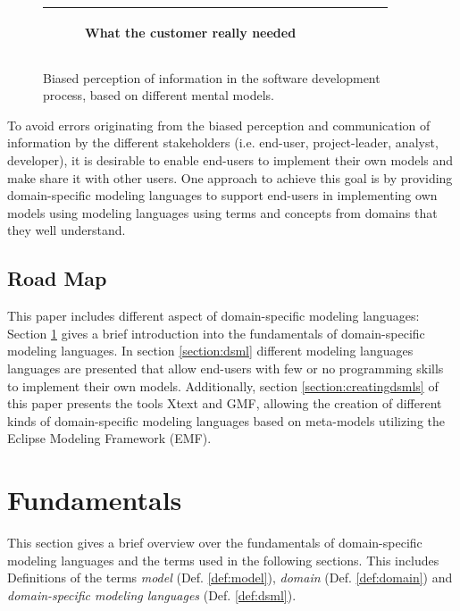 \documentclass[runningheads,a4paper]{llncs}
\begin{document}
\begin{figure}[h]
\begin{center}
\begin{tabular}{|c|c|c|c|c|}
\begin{subfigure}[t]{0.15\textwidth}
\caption*{\tiny \centering What the customer really needed}\label{fig:whatneeded}\end{subfigure}\\
\hline
\end{tabular}
\caption{Biased perception of information in the software development process, based on different mental models.}
\label{fig:swingexample}
\end{center}
\end{figure}
To avoid errors originating from the biased perception and communication of information by the different stakeholders (i.e. end-user, project-leader, analyst, developer), 
it is desirable to enable end-users to implement their own models and make share it with other users. 
One approach to achieve this goal is by providing domain-specific modeling languages to support 
end-users in implementing own models using modeling languages using terms and concepts from domains that they well understand.

\subsection{Road Map}
This paper includes different aspect of domain-specific modeling languages:
Section \ref{section:fundamentals} gives a brief introduction into the fundamentals of domain-specific modeling languages.
In section \ref{section:dsml} different  modeling languages languages are presented that allow end-users with few or no
programming skills to implement their own models.
Additionally, section \ref{section:creatingdsmls} of this paper presents the tools Xtext and GMF, allowing the creation of different kinds of domain-specific modeling languages
based on meta-models utilizing the Eclipse Modeling Framework (EMF).


\section{Fundamentals}
\label{section:fundamentals}
This section gives a brief overview over the fundamentals of domain-specific modeling languages 
and the terms used in the following sections. This includes Definitions of the terms \emph{model} (Def. \ref{def:model}), 
\emph{domain} (Def. \ref{def:domain}) and \emph{domain-specific modeling languages} (Def. \ref{def:dsml}).
\end{document}
